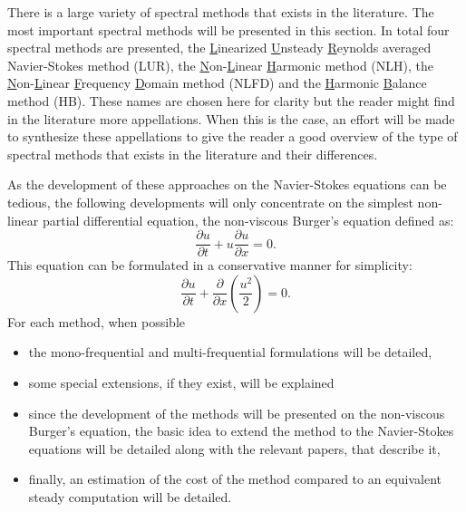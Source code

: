 
There is a large variety of spectral methods that exists in the
literature. 
The most important spectral methods will be presented in this section.
In total four spectral methods are presented, 
the \underline{L}inearized \underline{U}nsteady 
\underline{R}eynolds averaged
Navier-Stokes method (LUR), 
the \underline{N}on-\underline{L}inear 
\underline{H}armonic method (NLH), the \underline{N}on-\underline{L}inear 
\underline{F}requency \underline{D}omain
method (NLFD) and the \underline{H}armonic \underline{B}alance 
method (HB).
These names are chosen here
for clarity but the reader might find in the literature more
appellations. When this is the case, an effort will be made to synthesize
these appellations to give the reader a good 
overview of the type of spectral methods that exists in the literature
and their differences.

As the development of these approaches on the Navier-Stokes equations
can be tedious, the following developments 
will only concentrate on the simplest
non-linear partial differential equation, 
the non-viscous Burger's equation defined as:
\begin{equation}
	\frac{\partial u}{\partial t} + 
	u \frac{\partial u}{\partial x} = 
	0.
	\label{eq:sm_nonlinear_convection}
\end{equation}
This equation can be formulated in a conservative manner for simplicity:
\begin{equation}
	\frac{\partial u}{\partial t} + 
	\frac{\partial}{\partial x} \left( \frac{u^2}{2} \right) = 
	0.
	\label{eq:sm_nonlinear_convection_conservative}
\end{equation}
For each method, when possible
\begin{itemize} \itemsep0pt \parskip0pt
 	\item the mono-frequential and multi-frequential 
 	formulations will be detailed,
 	\item some special extensions, if they exist, will be explained
 	\item since the development of the methods will be 
 	presented on the non-viscous 
 	Burger's equation, 
	the basic idea to extend the method to the Navier-Stokes
	equations will be detailed along with the relevant papers,
	that describe it,
	\item finally, an estimation of the cost of the method 
	compared to an equivalent steady computation will be detailed.
\end{itemize}
